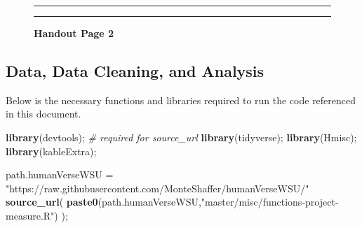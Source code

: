 \documentclass[]{article}
\newenvironment{Shaded}{\begin{snugshade}}{\end{snugshade}}
\newcommand{\CommentTok}[1]{\textcolor[rgb]{0.56,0.35,0.01}{\textit{#1}}}
\newcommand{\KeywordTok}[1]{\textcolor[rgb]{0.13,0.29,0.53}{\textbf{#1}}}
\newcommand{\NormalTok}[1]{#1}
\newcommand{\StringTok}[1]{\textcolor[rgb]{0.31,0.60,0.02}{#1}}
\begin{document}
\begin{figure}[!ht]
    \hrule
    \caption{ \textbf{Handout Page 2} }
    \begin{center}
    \end{center}
    \label{fig:handout-2}
    \hrule
\end{figure}

\newpage

\newpage

\subsection{Data, Data Cleaning, and Analysis}
\label{sec:appendix-setup}

Below is the necessary functions and libraries required to run the code
referenced in this document.

\begin{Shaded}
\begin{Highlighting}[]
\KeywordTok{library}\NormalTok{(devtools);       }\CommentTok{\# required for source\_url}
\KeywordTok{library}\NormalTok{(tidyverse);}
\KeywordTok{library}\NormalTok{(Hmisc);}
\KeywordTok{library}\NormalTok{(kableExtra);}

\NormalTok{path.humanVerseWSU =}\StringTok{ "https://raw.githubusercontent.com/MonteShaffer/humanVerseWSU/"}
\KeywordTok{source\_url}\NormalTok{( }\KeywordTok{paste0}\NormalTok{(path.humanVerseWSU,}\StringTok{"master/misc/functions{-}project{-}measure.R"}\NormalTok{) );}
\end{Highlighting}
\end{Shaded}
\end{document}
